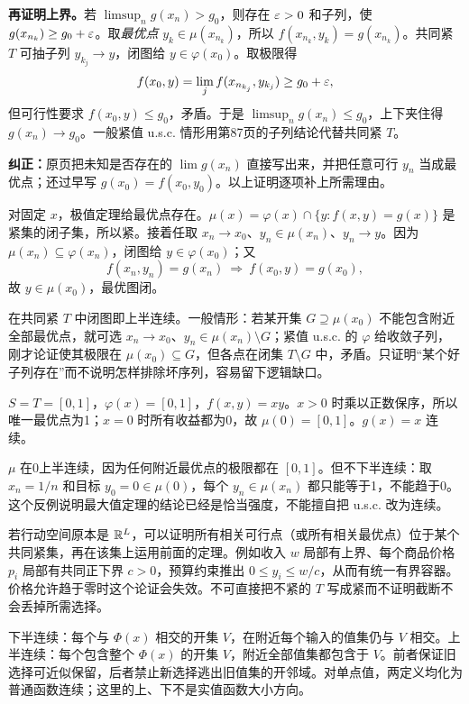 \textbf{再证明上界。}若 $\limsup_n g(x_n)>g_0$，则存在 $\varepsilon>0$ 和子列，使 $g(x_{n_k})\ge g_0+\varepsilon$。取\emph{最优点} $y_k\in\mu(x_{n_k})$，所以 $f(x_{n_k},y_k)=g(x_{n_k})$。共同紧 $T$ 可抽子列 $y_{k_j}\to y$，闭图给 $y\in\varphi(x_0)$。取极限得
\[f(x_0,y)=\lim_j f(x_{n_{k_j}},y_{k_j})\ge g_0+\varepsilon,\]
但可行性要求 $f(x_0,y)\le g_0$，矛盾。于是 $\limsup_n g(x_n)\le g_0$，上下夹住得 $g(x_n)\to g_0$。一般紧值 u.s.c. 情形用第87页的子列结论代替共同紧 $T$。

\textbf{纠正：}原页把未知是否存在的 $\lim g(x_n)$ 直接写出来，并把任意可行 $y_n$ 当成最优点；还过早写 $g(x_0)=f(x_0,y_0)$。以上证明逐项补上所需理由。

对固定 $x$，极值定理给最优点存在。$\mu(x)=\varphi(x)\cap\{y:f(x,y)=g(x)\}$ 是紧集的闭子集，所以紧。接着任取 $x_n\to x_0$、$y_n\in\mu(x_n)$、$y_n\to y$。因为 $\mu(x_n)\subseteq\varphi(x_n)$，闭图给 $y\in\varphi(x_0)$；又
\[f(x_n,y_n)=g(x_n)\ \Longrightarrow\ f(x_0,y)=g(x_0),\]
故 $y\in\mu(x_0)$，最优图闭。

在共同紧 $T$ 中闭图即上半连续。一般情形：若某开集 $G\supseteq\mu(x_0)$ 不能包含附近全部最优点，就可选 $x_n\to x_0$、$y_n\in\mu(x_n)\setminus G$；紧值 u.s.c. 的 $\varphi$ 给收敛子列，刚才论证使其极限在 $\mu(x_0)\subseteq G$，但各点在闭集 $T\setminus G$ 中，矛盾。只证明“某个好子列存在”而不说明怎样排除坏序列，容易留下逻辑缺口。

$S=T=[0,1]$，$\varphi(x)=[0,1]$，$f(x,y)=xy$。$x>0$ 时乘以正数保序，所以唯一最优点为1；$x=0$ 时所有收益都为0，故 $\mu(0)=[0,1]$。$g(x)=x$ 连续。

$\mu$ 在0上半连续，因为任何附近最优点的极限都在 $[0,1]$。但不下半连续：取 $x_n=1/n$ 和目标 $y_0=0\in\mu(0)$，每个 $y_n\in\mu(x_n)$ 都只能等于1，不能趋于0。这个反例说明最大值定理的结论已经是恰当强度，不能擅自把 u.s.c. 改为连续。

若行动空间原本是 $\mathbb{R}^L$，可以证明所有相关可行点（或所有相关最优点）位于某个共同紧集，再在该集上运用前面的定理。例如收入 $w$ 局部有上界、每个商品价格 $p_i$ 局部有共同正下界 $c>0$，预算约束推出 $0\le y_i\le w/c$，从而有统一有界容器。价格允许趋于零时这个论证会失效。不可直接把不紧的 $T$ 写成紧而不证明截断不会丢掉所需选择。

下半连续：每个与 $\Phi(x)$ 相交的开集 $V$，在附近每个输入的值集仍与 $V$ 相交。上半连续：每个包含整个 $\Phi(x)$ 的开集 $V$，附近全部值集都包含于 $V$。前者保证旧选择可近似保留，后者禁止新选择逃出旧值集的开邻域。对单点值，两定义均化为普通函数连续；这里的上、下不是实值函数大小方向。

